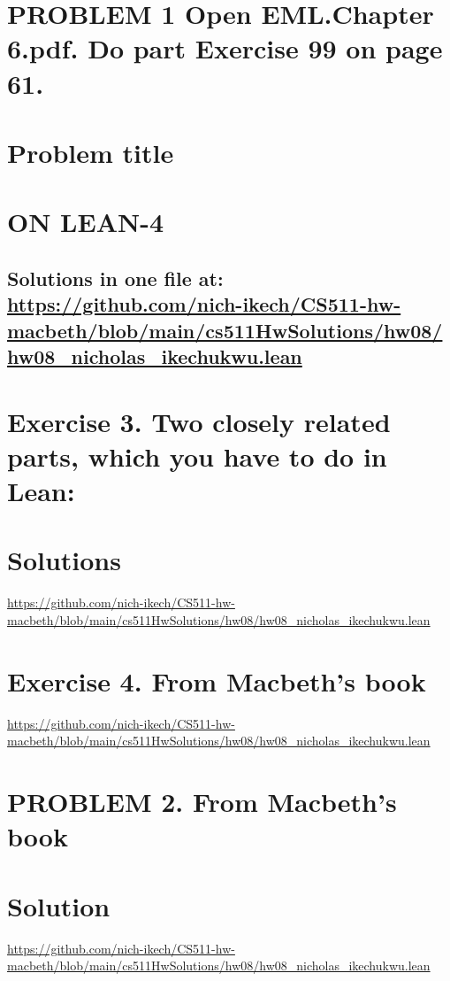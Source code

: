 \documentclass{article}
\begin{document}
\section*{PROBLEM 1 Open EML.Chapter 6.pdf. Do part Exercise 99 on page 61.}




\section*{Problem title}

\newpage







\section*{ON LEAN-4}
\subsection*{Solutions in one file at: 
\url{https://github.com/nich-ikech/CS511-hw-macbeth/blob/main/cs511HwSolutions/hw08/hw08_nicholas_ikechukwu.lean}}

\newpage

\section*{Exercise 3. Two closely related parts, which you have to do in Lean:}
\section*{Solutions}
\url{https://github.com/nich-ikech/CS511-hw-macbeth/blob/main/cs511HwSolutions/hw08/hw08_nicholas_ikechukwu.lean}

\newpage

\section*{Exercise 4. From Macbeth's book}

\url{https://github.com/nich-ikech/CS511-hw-macbeth/blob/main/cs511HwSolutions/hw08/hw08_nicholas_ikechukwu.lean}

\newpage

\section*{PROBLEM 2. From Macbeth's book}
\section*{Solution}

\url{https://github.com/nich-ikech/CS511-hw-macbeth/blob/main/cs511HwSolutions/hw08/hw08_nicholas_ikechukwu.lean}
\end{document}
